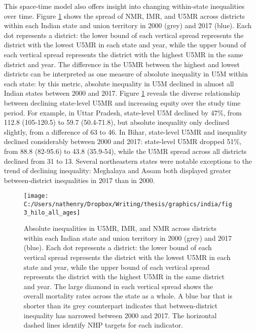 \documentclass[
]{article}
\begin{document}
This space-time model also offers insight into changing within-state inequalities over time. Figure \ref{fig:hilo} shows the spread of NMR, IMR, and U5MR across districts within each Indian state and union territory in 2000 (grey) and 2017 (blue). Each dot represents a district: the lower bound of each vertical spread represents the district with the lowest U5MR in each state and year, while the upper bound of each vertical spread represents the district with the highest U5MR in the same district and year. The difference in the U5MR between the highest and lowest districts can be interpreted as one measure of absolute inequality in U5M within each state: by this metric, absolute inequality in U5M declined in almost all Indian states between 2000 and 2017. Figure \ref{fig:hilo} reveals the diverse relationship between declining state-level U5MR and increasing equity over the study time period. For example, in Uttar Pradesh, state-level U5M declined by 47\%, from 112.8 (105-120.5) to 59.7 (50.4-71.8), but absolute inequality only declined slightly, from a difference of 63 to 46. In Bihar, state-level U5MR and inequality declined considerably between 2000 and 2017: state-level U5MR dropped 51\%, from 88.8 (82-95.6) to 43.8 (35.9-54), while the U5MR spread across all districts declined from 31 to 13. Several northeastern states were notable exceptions to the trend of declining inequality: Meghalaya and Assam both displayed greater between-district inequalities in 2017 than in 2000.

\begin{figure}[!hbt]

{\centering \texttt{[image: C:/Users/nathenry/Dropbox/Writing/thesis/graphics/india/fig3\_hilo\_all\_ages]} 

}

\caption{Absolute inequalities in U5MR, IMR, and NMR across districts within each Indian state and union territory in 2000 (grey) and 2017 (blue). Each dot represents a district: the lower bound of each vertical spread represents the district with the lowest U5MR in each state and year, while the upper bound of each vertical spread represents the district with the highest U5MR in the same district and year. The large diamond in each vertical spread shows the overall mortality rates across the state as a whole. A blue bar that is shorter than its grey counterpart indicates that between-district inequality has narrowed between 2000 and 2017. The horizontal dashed lines identify NHP targets for each indicator.}\label{fig:hilo}
\end{figure}
\end{document}
